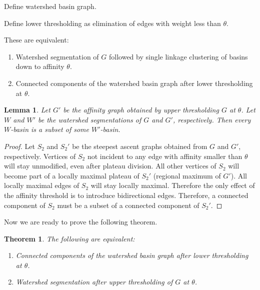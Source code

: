 \documentclass{article}
\newtheorem{lemma}{Lemma}
\newtheorem{theorem}{Theorem}
\begin{document}
Define watershed basin graph.

Define lower thresholding as elimination of edges with weight less than $\theta$.

These are equivalent:
\begin{enumerate}
\item Watershed segmentation of $G$ followed by single linkage clustering of basins down to affinity $\theta$.
\item Connected components of the watershed basin graph after lower
  thresholding at $\theta$.
  \end{enumerate}

\begin{lemma}
  Let $G'$ be the affinity graph obtained by upper thresholding $G$ at
  $\theta$.  Let $W$ and $W'$ be the watershed segmentations of $G$
  and $G'$, respectively.  Then every $W$-basin is a subset of some
  $W'$-basin.
  \end{lemma}

\begin{proof}
Let $S_2$ and $S_2'$ be the steepest ascent graphs obtained from $G$
and $G'$, respectively.  Vertices of $S_2$ not incident to any edge
with affinity smaller than $\theta$ will stay unmodified, even after
plateau division. All other vertices of $S_2$ will become part of a
locally maximal plateau of $S_2'$ (regional maximum of $G'$). All
locally maximal edges of $S_2$ will stay locally maximal. Therefore
the only effect of the affinity threshold is to introduce
bidirectional edges. Therefore, a connected component of $S_2$ must
be a subset of a connected component of $S_2'$.
\end{proof}

Now we are ready to prove the following theorem.
\begin{theorem}
The following are equivalent:
\begin{enumerate}
\item Connected components of the watershed basin graph after lower
  thresholding at $\theta$.
\item Watershed segmentation after upper thresholding of $G$ at $\theta$.
  \end{enumerate}
\end{theorem}
\end{document}
